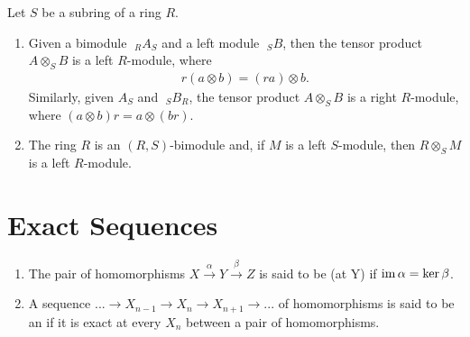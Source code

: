     \begin{proposition}\label{prop:extending scalars}
        Let $S$ be a subring of a ring $R$.
        \begin{enumerate}[label = (\arabic*)]
            \item Given a bimodule $\phantom{.}_R A_S$ and a left module $\phantom{.}_S B$, then the tensor product $A \otimes_S B$ is a left $R$-module, where
                \begin{equation*}
                \begin{split}
                    r(a \otimes b) = (ra) \otimes b.
                \end{split}
                \end{equation*}
            Similarly, given $A_S$ and $\phantom{.}_S B_R$, the tensor product $A \otimes_S B$ is a right $R$-module, where $(a \otimes b)r = a \otimes (br)$.

            \item The ring $R$ is an $(R,S)$-bimodule and, if $M$ is a left $S$-module, then $R \otimes_S M$ is a left $R$-module.
        \end{enumerate}
    \end{proposition}

\section{Exact Sequences}
    \begin{definition}
        \phantom{a}
        \begin{enumerate}[label = (\arabic*)]
            \item The pair of homomorphisms $X \xrightarrow{\alpha} Y \xrightarrow{\beta} Z$ is said to be  (at Y) if $\operatorname{im}{\alpha} = \ker{\beta}$.
            \item A sequence $... \rightarrow X_{n-1} \rightarrow X_n \rightarrow X_{n+1} \rightarrow ...$ of homomorphisms is said to be an  if it is exact at every $X_n$ between a pair of homomorphisms.
        \end{enumerate}
    \end{definition}

